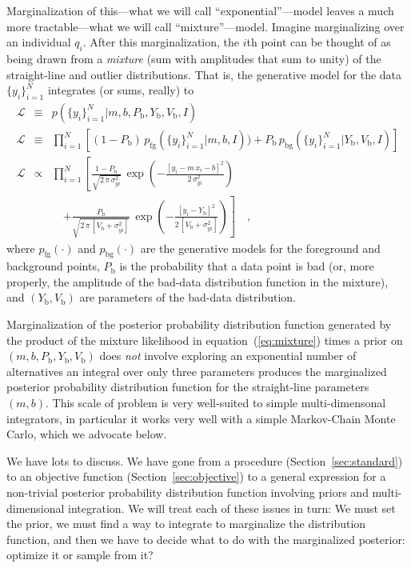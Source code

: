 \documentclass[12pt,twoside]{article}
\newcommand{\sectionname}{Section}
\newcommand{\equationname}{equation}
\newcounter{problem}
\newcommand{\setofall}[3]{\{{#1}\}_{{#2}}^{{#3}}}
\newcommand{\ally}{\setofall{y_i}{i=1}{N}}
\newcommand{\like}{\mathscr{L}}
\newcommand{\pfg}{p_{\mathrm{fg}}}
\newcommand{\pbg}{p_{\mathrm{bg}}}
\newcommand{\Pbad}{P_{\mathrm{b}}}
\newcommand{\Ybad}{Y_{\mathrm{b}}}
\newcommand{\Vbad}{V_{\mathrm{b}}}
\begin{document}
Marginalization of this---what we will call ``exponential''---model
leaves a much more tractable---what we will call ``mixture''---model.
Imagine marginalizing over an individual $q_i$.  After this
marginalization, the $i$th point can be thought of as being drawn from
a \emph{mixture} (sum with amplitudes that sum to unity) of the
straight-line and outlier distributions.  That is, the generative
model for the data $\ally$ integrates (or sums, really) to
\begin{eqnarray}\label{eq:mixture}\displaystyle
\like &\equiv& p(\ally|m,b,\Pbad,\Ybad,\Vbad,I)
 \nonumber\\
\like &\equiv& \prod_{i=1}^N
 \left[ (1-\Pbad)\,\pfg(\ally|m,b,I))
 + \Pbad\,\pbg(\ally|\Ybad,\Vbad,I) \right]
 \nonumber\\
\like &\propto&
 \prod_{i=1}^N \left[\frac{1-\Pbad}{\sqrt{2\,\pi\,\sigma_{yi}^2}}
 \,\exp\left(-\frac{[y_i-m\,x_i-b]^2}{2\,\sigma_{yi}^2}\right)\right.
 \nonumber \\ & & \quad
 \left.+ \frac{\Pbad}{\sqrt{2\,\pi\,[\Vbad+\sigma_{yi}^2]}}
 \,\exp\left(-\frac{[y_i-\Ybad]^2}{2\,[\Vbad+\sigma_{yi}^2]}\right)\right]
 \quad ,
\end{eqnarray}
where $\pfg(\cdot)$ and $\pbg(\cdot)$ are the generative models for
the foreground and background points, $\Pbad$ is the probability that
a data point is bad (or, more properly, the amplitude of the bad-data
distribution function in the mixture), and $(\Ybad,\Vbad)$ are
parameters of the bad-data distribution.

Marginalization of the posterior probability distribution function
generated by the product of the mixture likelihood in
\equationname~(\ref{eq:mixture}) times a prior on
$(m,b,\Pbad,\Ybad,\Vbad)$ does \emph{not} involve exploring an
exponential number of alternatives an integral over only three
parameters produces the marginalized posterior probability
distribution function for the straight-line parameters $(m,b)$.  This
scale of problem is very well-suited to simple multi-dimensonal
integrators, in particular it works very well with a simple
Markov-Chain Monte Carlo, which we advocate below.

We have lots to discuss.  We have gone from a procedure
(\sectionname~\ref{sec:standard}) to an objective function
(\sectionname~\ref{sec:objective}) to a general expression for a
non-trivial posterior probability distribution function involving
priors and multi-dimensional integration.  We will treat each of
these issues in turn: We must set the prior, we must find a way to
integrate to marginalize the distribution function, and then we have
to decide what to do with the marginalized posterior: optimize it or
sample from it?
\end{document}
